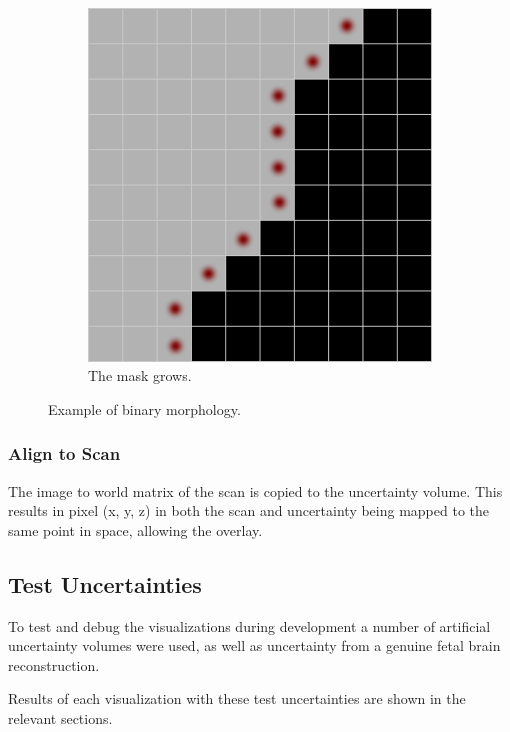 \begin{figure}[H]
\begin{subfigure}[b]{0.5\textwidth}
    \includegraphics[width=\textwidth]{images/erosion/growing_2.png}
    \caption{The mask grows.}\label{fig:growing_2}
  \end{subfigure}
  \caption{Example of binary morphology.}\label{fig:growing}
\end{figure}

\subsubsection*{Align to Scan}
The image to world matrix of the scan is copied to the uncertainty volume. This results in pixel (x, y, z) in both the scan and uncertainty being mapped to the same point in space, allowing the overlay.

\clearpage
\subsection{Test Uncertainties}\label{section:testuncertainties}
To test and debug the visualizations during development a number of artificial uncertainty volumes were used, as well as uncertainty from a genuine fetal brain reconstruction.

Results of each visualization with these test uncertainties are shown in the relevant sections.

